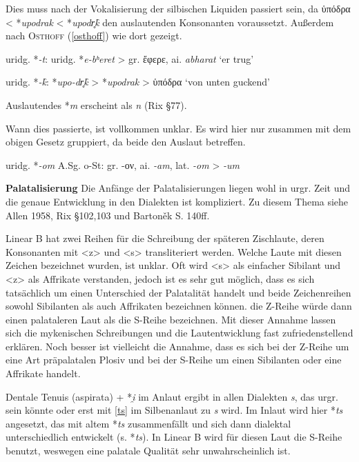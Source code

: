 \documentclass[12pt,a4paper,normalheadings]{scrartcl}
\newcounter{para}
\newcommand{\mypara}[1]{\vspace{1em}\par\noindent\refstepcounter{para}%
\textbf{\textsf{\thepara}}\enspace\textbf{#1}\quad}
\def\rek#1{\mbox{*\textit{#1}}}
\def\bel#1{\mbox{\textit{#1}}}
\begin{document}
Dies muss nach der Vokalisierung der silbischen Liquiden passiert sein,
da ὑπόδρα < \rek{upodrak} < \rek{upodr̥k̑} den auslautenden Konsonanten
voraussetzt.
Außerdem nach \textsc{Osthoff} (\ref{osthoff}) wie dort gezeigt.

\lex{\rek{\{Okklu.\}+}}{\rek{Ø}}{\_\#}

uridg. \rek{-t}: uridg. \rek{e-bʰeret} > gr. ἔφερε, ai. \bel{abharat} `er trug'

uridg. \rek{-k̑}: \rek{upo-dr̥k̑} > \rek{upodrak} > ὑπόδρα `von unten guckend'

\bigskip\noindent
Auslautendes \rek{m} erscheint als \bel{n} (Rix §77).

Wann dies passierte, ist vollkommen unklar.
Es wird hier nur zusammen mit dem obigen Gesetz gruppiert,
da beide den Auslaut betreffen.

\lex{\rek{m}}{\rek{n}}{\_\#}

uridg. \rek{-om} A.Sg. o-St: gr. -ον, ai. \bel{-am}, lat. \bel{-om} > \bel{-um}


\mypara{Palatalisierung}
\label{pal}
Die Anfänge der Palatalisierungen liegen wohl in urgr. Zeit
und die genaue Entwicklung in den Dialekten ist kompliziert.
Zu diesem Thema siehe Allen 1958, Rix §102,103 und Bartoněk S. 140ff.

Linear B hat zwei Reihen für die Schreibung der späteren Zischlaute,
deren Konsonanten mit <z> und <s> transliteriert werden.
Welche Laute mit diesen Zeichen bezeichnet wurden, ist unklar.
Oft wird <s> als einfacher Sibilant und <z> als Affrikate verstanden,
jedoch ist es sehr gut möglich,
dass es sich tatsächlich um einen Unterschied der Palatalität handelt
und beide Zeichenreihen sowohl Sibilanten als auch Affrikaten bezeichnen können.
die Z-Reihe würde dann einen palataleren Laut als die S-Reihe bezeichnen.
Mit dieser Annahme lassen sich die mykenischen Schreibungen
und die Lautentwicklung fast zufriedenstellend erklären.
Noch besser ist vielleicht die Annahme,
dass es sich bei der Z-Reihe um eine Art präpalatalen Plosiv
und bei der S-Reihe um einen Sibilanten oder eine Affrikate handelt.

Dentale Tenuis (aspirata) + \rek{i̯} im Anlaut ergibt in allen Dialekten \bel{s},
das urgr. sein könnte oder erst mit \ref{ts} im Silbenanlaut zu \bel{s} wird.
Im Inlaut wird hier \rek{ts} angesetzt, das mit altem \rek{ts} zusammenfällt
und sich dann dialektal unterschiedlich entwickelt (s. \rek{ts}).
In Linear B wird für diesen Laut die S-Reihe benutzt,
weswegen eine palatale Qualität sehr unwahrscheinlich ist.
\end{document}
